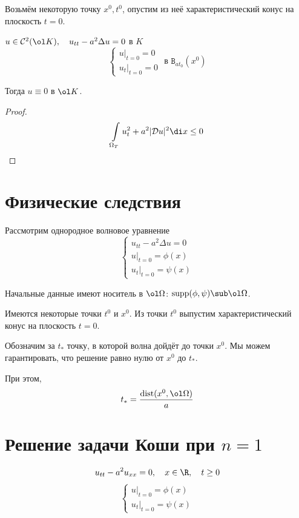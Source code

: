\begin{implication}
	Возьмём некоторую точку $ x^0, t^0 $, опустим из неё характеристический конус на
	плоскость $ t = 0 $.

	$ u \in \mathcal C^2(\ol K), \quad u_{tt} - a^2 \Delta u = 0 $ в $ K $
	$$
	\begin{cases}
		u \bigr|_{t = 0} = 0 \\
		u_t \bigr|_{t = 0} = 0
	\end{cases} \text{ в } \mathtt B_{at_0}(x^0) $$

	Тогда $ u \equiv 0 $ в $ \ol K $.
\end{implication}

\begin{proof}
	$$ \int\limits_{\Omega_T} u_t^2 + a^2 |\mathcal Du|^2 \di x \le 0 $$
\end{proof}

\section{Физические следствия}

Рассмотрим однородное волновое уравнение
$$
\begin{cases}
	u_{tt} - a^2 \Delta u = 0 \\
	u\bigr|_{t = 0} = \phi(x) \\
	u_t \bigr|_{t = 0} = \psi(x)
\end{cases} $$

Начальные данные имеют носитель в $ \ol\Omega $: $ \operatorname{supp}(\phi, \psi) \sub \ol\Omega $.

Имеются некоторые точки $ t^0 $ и $ x^0 $.
Из точки $ t^0 $ выпустим характеристический конус на плоскость $ t = 0 $.

Обозначим за $ t_* $ точку, в которой волна дойдёт до точки $ x^0 $.
Мы можем гарантировать, что решение равно нулю от $ x^0 $ до $ t_* $.

При этом,
$$ t_* = \frac{\operatorname{dist}(x^0, \ol\Omega)}a $$

\section{Решение задачи Коши при \texorpdfstring{$ n = 1 $}{n = 1}}

$$ u_{tt} - a^2u_{xx} = 0, \quad x \in \R, \quad t \ge 0 $$
$$
\begin{cases}
	u \bigr|_{t = 0} = \phi(x) \\
	u_t \bigr|_{t = 0} = \psi(x)
\end{cases} $$

